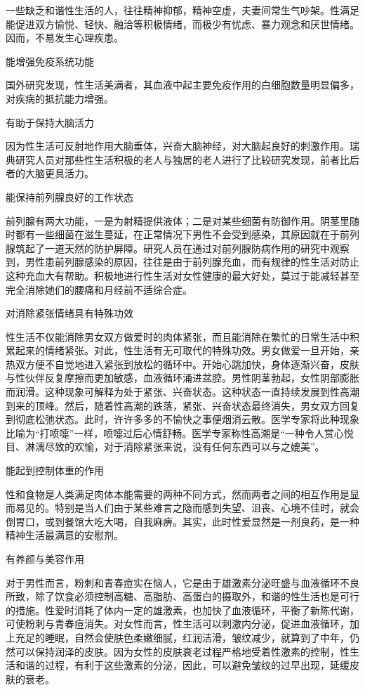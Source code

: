 \documentclass[12pt,UTF8]{ctexbook}
\begin{document}
一些缺乏和谐性生活的人，往往精神抑郁，精神空虚，夫妻间常生气吵架。性满足能促进双方愉悦、轻快、融洽等积极情绪，而极少有忧虑、暴力观念和厌世情绪。因而，不易发生心理疾患。

能增强免疫系统功能

国外研究发现，性生活美满者，其血液中起主要免疫作用的白细胞数量明显偏多，对疾病的抵抗能力增强。

有助于保持大脑活力

因为性生活可反射地作用大脑垂体，兴奋大脑神经，对大脑起良好的刺激作用。瑞典研究人员对那些性生活积极的老人与独居的老人进行了比较研究发现，前者比后者的大脑更具活力。

能保持前列腺良好的工作状态

前列腺有两大功能，一是为射精提供液体；二是对某些细菌有防御作用。阴茎里随时都有一些细菌在滋生蔓延，在正常情况下男性不会受到感染，其原因就在于前列腺筑起了一道天然的防护屏障。研究人员在通过对前列腺防病作用的研究中观察到，男性患前列腺感染的原因，往往是由于前列腺充血，而有规律的性生活对防止这种充血大有帮助。积极地进行性生活对女性健康的最大好处，莫过于能减轻甚至完全消除她们的腰痛和月经前不适综合症。

对消除紧张情绪具有特殊功效

性生活不仅能消除男女双方做爱时的肉体紧张，而且能消除在繁忙的日常生活中积累起来的情绪紧张。对此，性生活有无可取代的特殊功效。男女做爱一旦开始，亲热双方便不自觉地进入紧张到放松的循环中。开始心跳加快，身体逐渐兴奋，皮肤与性伙伴反复摩擦而更加敏感，血液循环涌进盆腔。男性阴茎勃起，女性阴部膨胀而润滑。这种现象可解释为处于紧张、兴奋状态。这种状态一直持续发展到性高潮到来的顶峰。然后，随着性高潮的跌落，紧张、兴奋状态最终消失，男女双方回复到彻底松弛状态。此时，许许多多的不愉快之事便烟消云散。医学专家将此种现象比喻为“打喷嚏”一样，喷嚏过后心情舒畅。医学专家称性高潮是“一种令人赏心悦目、淋漓尽致的欢愉，对于消除紧张来说，没有任何东西可以与之媲美”。

能起到控制体重的作用

性和食物是人类满足肉体本能需要的两种不同方式，然而两者之间的相互作用是显而易见的。特别是当人们由于某些难言之隐而感到失望、沮丧、心境不佳时，就会倒胃口，或到餐馆大吃大喝，自我麻痹。其实，此时性爱显然是一剂良药，是一种精神生活最满意的安慰剂。

有养颜与美容作用

对于男性而言，粉刺和青春痘实在恼人，它是由于雄激素分泌旺盛与血液循环不良所致，除了饮食必须控制高糖、高脂肪、高蛋白的摄取外，和谐的性生活也是可行的措施。性爱时消耗了体内一定的雄激素，也加快了血液循环，平衡了新陈代谢，可使粉刺与青春痘消失。对女性而言，性生活可以刺激内分泌，促进血液循环，加上充足的睡眠，自然会使肤色柔嫩细腻，红润洁滑，皱纹减少，就算到了中年，仍然可以保持润泽的皮肤。因为女性的皮肤衰老过程严格地受着性激素的控制，性生活和谐的过程，有利于这些激素的分泌，因此，可以避免皱纹的过早出现，延缓皮肤的衰老。
\end{document}
